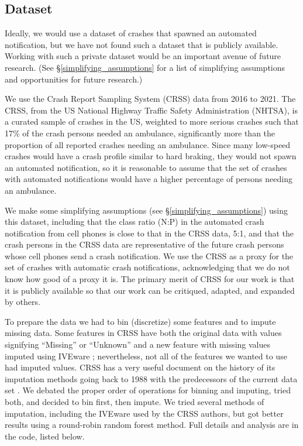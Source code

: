 \subsection{Dataset}
\label{dataset}

Ideally, we would use a dataset of crashes that spawned an automated notification, but we have not found such a dataset that is publicly available.  Working with such a private dataset would be an important avenue of future research. (See \S \ref{simplifying_assumptions} for a list of simplifying assumptions and opportunities for future research.)

We use the Crash Report Sampling System (CRSS) data from 2016 to 2021.  The CRSS, from the US National Highway Traffic Safety Administration (NHTSA), is a curated sample of crashes in the US, weighted to more serious crashes such that 17\% of the crash persons needed an ambulance, significantly more than the proportion of all reported crashes needing an ambulance.  Since many low-speed crashes would have a crash profile similar to hard braking, they would not spawn an automated notification, so it is reasonable to assume that the set of crashes with automated notifications would have a higher percentage of persons needing an ambulance.  

We make some simplifying assumptions (see \S\ref{simplifying_assumptions}) using this dataset, including that the class ratio (N:P) in the automated crash notification from cell phones is close to that in the CRSS data, 5:1, and that the crash persons in the CRSS data are representative of the future crash persons whose cell phones send a crash notification.  We use the CRSS as a proxy for the set of crashes with automatic crash notifications, acknowledging that we do not know how good of a proxy it is. The primary merit of CRSS for our work is that it is publicly available so that our work can be critiqued, adapted, and expanded by others.  

To prepare the data we had to bin (discretize) some features and to impute missing data.  Some features in CRSS have both the original data with values signifying ``Missing'' or ``Unknown'' and a new feature with missing values imputed using IVEware \citep{IVEware}; nevertheless, not all of the features we wanted to use had imputed values.  CRSS has a very useful document on the history of its imputation methods going back to 1988 with the predecessors of the current data set \citep{CRSS_Imputation}.  We debated the proper order of operations for binning and imputing, tried both, and decided to bin first, then impute.  We tried several methods of imputation, including the IVEware used by the CRSS authors, but got better results using a round-robin random forest method.  Full details and analysis are in the code, listed below.

